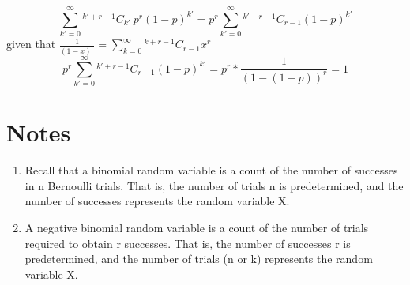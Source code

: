 \documentclass[12pt]{article}
\theoremstyle{definition}
\newcommand*{\Comb}[2]{{}^{#1}C_{#2}}%
\begin{document}
\begin{equation}
    \displaystyle \sum_{k' = 0}^{\infty} \Comb{k' + r -1}{k'} \ p^r (1-p)^{k'} =
    p^r \sum_{k'= 0}^{\infty}  \Comb{k' + r-1}{r-1}(1-p)^{k'}
\end{equation}
given that $ \displaystyle \frac{1}{(1-x)^r} = \sum_{k=0}^{\infty} \Comb{k+r-1}{r-1}x^r $
\begin{equation}
    \displaystyle p^r \sum_{k'= 0}^{\infty}  \Comb{k' + r-1}{r-1}(1-p)^{k'} = p^r * \frac{1}{(1-(1-p))^r} = 1 
\end{equation}
\section{Notes}
\begin{enumerate}
    \item Recall that a binomial random variable is a count of the number
    of successes in n Bernoulli trials. That is, the number of trials n is
    predetermined, and the number of successes represents the random variable X.
    \item  A negative binomial random variable is a count of the number of
trials required to obtain r successes. That is, the number of
successes r is predetermined, and the number of trials (n or k)
represents the random variable X.
\end{enumerate}    
\end{document}
